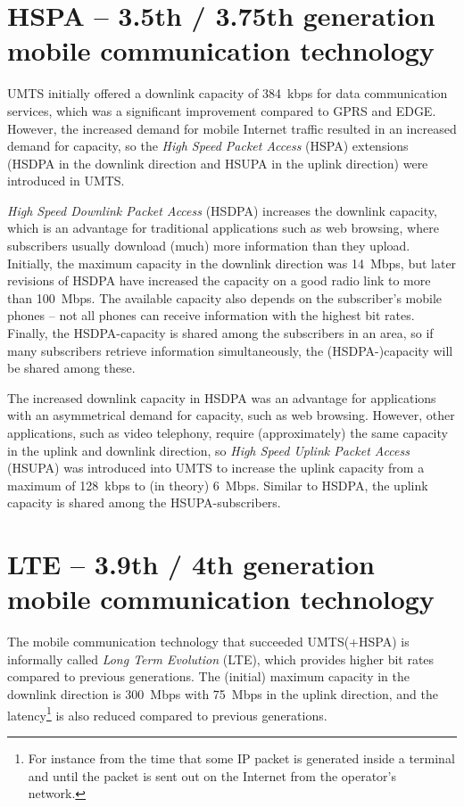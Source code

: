 \section{HSPA -- 3.5th / 3.75th generation mobile communication technology}
UMTS initially offered a downlink capacity of 384~kbps for data communication services, which was a significant improvement compared to GPRS and EDGE. However, the increased demand for mobile Internet traffic resulted in an increased demand for capacity, so the \emph{High Speed Packet Access} (HSPA) extensions (HSDPA in the downlink direction and HSUPA in the uplink direction) were introduced in UMTS.

\emph{High Speed Downlink Packet Access} (HSDPA) increases the downlink capacity, which is an advantage for traditional applications such as web browsing, where subscribers usually download (much) more information than they upload. Initially, the maximum capacity in the downlink direction was 14~Mbps, but later revisions of HSDPA have increased the capacity on a good radio link to more than 100~Mbps. The available capacity also depends on the subscriber's mobile phones -- not all phones can receive information with the highest bit rates. Finally, the HSDPA-capacity is shared among the subscribers in an area, so if many subscribers retrieve information simultaneously, the (HSDPA-)capacity will be shared among these.

The increased downlink capacity in HSDPA was an advantage for applications with an asymmetrical demand for capacity, such as web browsing. However,  other applications, such as video telephony, require (approximately) the same capacity in the uplink and downlink direction, so \emph{High Speed Uplink Packet Access} (HSUPA) was introduced into UMTS to increase the uplink capacity from a maximum of 128~kbps to (in theory) 6~Mbps. Similar to HSDPA, the uplink capacity is shared among the HSUPA-subscribers.

\section{LTE -- 3.9th / 4th generation mobile communication technology}\label{sec:lte}
The mobile communication technology that succeeded UMTS(+HSPA) is informally called \emph{Long Term Evolution} (LTE), which provides higher bit rates compared to previous generations. The (initial) maximum capacity in the downlink direction is 300~Mbps with 75~Mbps in the uplink direction, and the latency\footnote{For instance from the time that some IP packet is generated inside a terminal and until the packet is sent out on the Internet from the operator's network.} is also reduced compared to previous generations.

